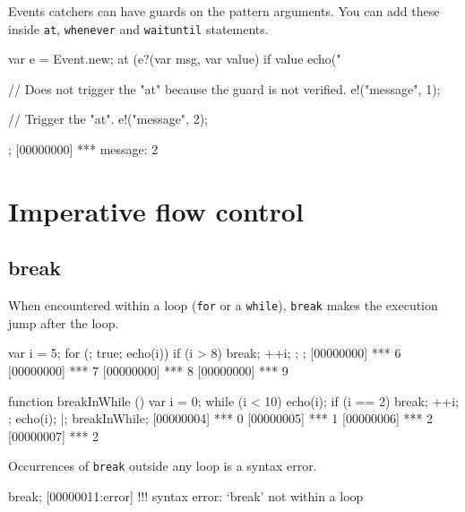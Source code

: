 Events catchers can have guards on the pattern arguments.  You can add these
inside \lstinline{at}, \lstinline{whenever} and \lstinline{waituntil}
statements.

\begin{urbiscript}
{
  var e = Event.new;
  at (e?(var msg, var value) if value %
    echo("%

  // Does not trigger the "at" because the guard is not verified.
  e!("message", 1);

  // Trigger the "at".
  e!("message", 2);
};
[00000000] *** message: 2
\end{urbiscript}


\section{Imperative flow control}

\subsection{break}
\label{sec:lang:break}

When encountered within a loop (\lstinline|for| or a \lstinline|while|),
\lstinline|break| makes the execution jump after the loop.

\begin{urbiscript}
{
  var i = 5;
  for (; true; echo(i))
  {
    if (i > 8)
      break;
    ++i;
  };
};
[00000000] *** 6
[00000000] *** 7
[00000000] *** 8
[00000000] *** 9
\end{urbiscript}

\begin{urbiscript}
function breakInWhile ()
{
  var i = 0;
  while (i < 10)
  {
    echo(i);
    if (i == 2)
      break;
    ++i;
  };
  echo(i);
}|;
breakInWhile;
[00000004] *** 0
[00000005] *** 1
[00000006] *** 2
[00000007] *** 2
\end{urbiscript}

Occurrences of \lstinline|break| outside any loop is a syntax error.

\begin{urbiscript}
break;
[00000011:error] !!! syntax error: `break' not within a loop
\end{urbiscript}

